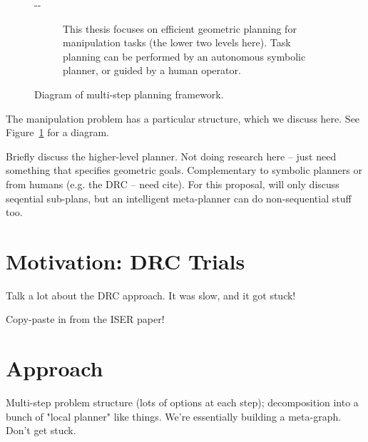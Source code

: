 \documentclass{report}
\newlength{\offsetpage}
\newenvironment{widepage}
   {\begin{adjustwidth}{-\offsetpage}{-\offsetpage}%
    \addtolength{\textwidth}{2\offsetpage}}%
{\end{adjustwidth}}
\begin{document}
{\begin{figure}
\begin{widepage}
\begin{center}
\begin{subfigure}[t]{\linewidth}
\begin{center}
\end{center}
\caption{This thesis focuses on efficient geometric planning
   for manipulation tasks (the lower two levels here).
   Task planning can be performed by an autonomous
   symbolic planner,
   or guided by a human operator.}
\end{subfigure}

\end{center}
\caption{Diagram of multi-step planning framework.}
\label{fig:diagram-multi-step}
\end{widepage}
\end{figure}
}

The manipulation problem has a particular structure,
which we discuss here.
See Figure~\ref{fig:diagram-multi-step}
for a diagram.

Briefly discuss the higher-level planner.
Not doing research here -- just need something that specifies
geometric goals.
Complementary to symbolic planners
or from humans (e.g. the DRC -- need cite).
For this proposal,
will only discuss seqential sub-plans,
but an intelligent meta-planner
can do non-sequential stuff too.

\section{Motivation: DRC Trials}

Talk a lot about the DRC approach.
It was slow, and it got stuck!

Copy-paste in from the ISER paper!

\section{Approach}

Multi-step problem structure (lots of options at each step);
decomposition into a bunch of "local planner" like things.
We're essentially building a meta-graph.
Don't get stuck.
\end{document}
